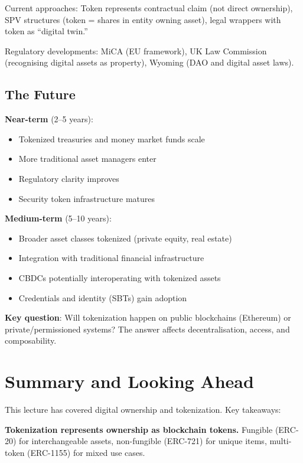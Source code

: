 \documentclass[11pt,a4paper]{article}
\begin{document}
Current approaches: Token represents contractual claim (not direct ownership), SPV structures (token = shares in entity owning asset), legal wrappers with token as ``digital twin.''

Regulatory developments: MiCA (EU framework), UK Law Commission (recognising digital assets as property), Wyoming (DAO and digital asset laws).

\subsection{The Future}

\textbf{Near-term} (2--5 years):
\begin{itemize}
    \item Tokenized treasuries and money market funds scale
    \item More traditional asset managers enter
    \item Regulatory clarity improves
    \item Security token infrastructure matures
\end{itemize}

\textbf{Medium-term} (5--10 years):
\begin{itemize}
    \item Broader asset classes tokenized (private equity, real estate)
    \item Integration with traditional financial infrastructure
    \item CBDCs potentially interoperating with tokenized assets
    \item Credentials and identity (SBTs) gain adoption
\end{itemize}

\textbf{Key question}: Will tokenization happen on public blockchains (Ethereum) or private/permissioned systems? The answer affects decentralisation, access, and composability.

\section{Summary and Looking Ahead}

This lecture has covered digital ownership and tokenization. Key takeaways:

\textbf{Tokenization represents ownership as blockchain tokens.} Fungible (ERC-20) for interchangeable assets, non-fungible (ERC-721) for unique items, multi-token (ERC-1155) for mixed use cases.
\end{document}
